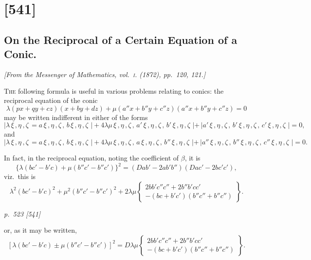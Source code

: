 \documentclass[11pt,a4paper]{article}
\theoremstyle{plain}
\theoremstyle{definition}
\begin{document}
\section{[541]}
\subsection{On the Reciprocal of a Certain Equation of a Conic.}

\begin{center}
\textit{[From the Messenger of Mathematics, vol.~\textsc{i}. (1872), pp.~120, 121.]}
\end{center}

\textsc{The} following formula is useful in various problems relating to conics: the reciprocal equation of the conic
\[
\lambda (px + qy + cz)(x + by + dz) + \mu (a''x + b''y + c''z)(a''x + b''y + c''z) = 0
\]
may be written indifferent in either of the forms
\[
|\lambda \, \xi\,, \eta\,, \zeta \, = a \, \xi\,, \eta\,, \zeta \, , \, b \, \xi\,, \eta\,, \zeta \, \, |+ 4 \lambda \mu \, \xi\,, \eta\,, \zeta \, , \, a' \, \xi\,, \eta\,, \zeta \, , \, b' \, \xi\,, \eta\,, \zeta \, \, |+ \, |a' \, \xi\,, \eta\,, \zeta \, , \, b' \, \xi\,, \eta\,, \zeta \, , \, c' \, \xi\,, \eta\,, \zeta \, \, | = 0,
\]
and
\[
|\lambda \, \xi\,, \eta\,, \zeta \, = a \, \xi\,, \eta\,, \zeta \, , \, b \, \xi\,, \eta\,, \zeta \, \, |+ 4 \lambda \mu \, \xi\,, \eta\,, \zeta \, , \, a \, \xi\,, \eta\,, \zeta \, , \, b'' \, \xi\,, \eta\,, \zeta \, \, |+ \, |a'' \, \xi\,, \eta\,, \zeta \, , \, b'' \, \xi\,, \eta\,, \zeta \, , \, c'' \, \xi\,, \eta\,, \zeta \, \, | = 0.
\]

In fact, in the reciprocal equation, noting the coefficient of $\beta$, it is
\[
\{\lambda (bc' - b'c) + \mu (b''c' - b''c')\}^2 = (Dab' - 2ab' b'') (Dac' - 2bc'c'),
\]
viz.\ this is
\[
\lambda^2 (bc' - b'c)^2 + \mu^2 (b''c' - b''c')^2 + 2\lambda\mu \left\{ \begin{array}{l} 2bb'c''c'' + 2b''b'cc' \\ -(bc + b'c')(b''c'' + b''c'') \end{array} \right\}.
\]

\clearpage

\bigskip
\textit{p.~523 [541]}
\smallskip

or, as it may be written,
\[
[\lambda (bc' - b'c) \pm \mu (b''c' - b''c')]^2 = D\lambda\mu \left\{ \begin{array}{l} 2bb'c''c'' + 2b''b'cc' \\ -(bc + b'c')(b''c'' + b''c'') \end{array} \right\}.
\]
\end{document}

